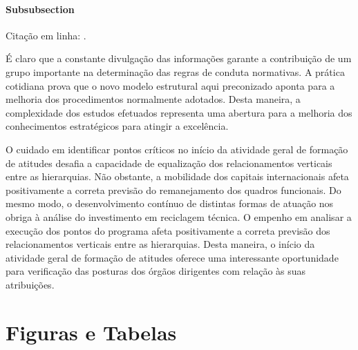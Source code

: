 \documentclass[a5paper,10pt]{udesc}
\begin{document}
\subsubsection{Subsubsection}

Citação em linha: .

\cite{MQ04}
\cite{lopes2012dissertacao}
\cite{CL89}

          É claro que a constante divulgação das informações garante a contribuição de um grupo importante na determinação das regras de conduta normativas. A prática cotidiana prova que o novo modelo estrutural aqui preconizado aponta para a melhoria dos procedimentos normalmente adotados. Desta maneira, a complexidade dos estudos efetuados representa uma abertura para a melhoria dos conhecimentos estratégicos para atingir a excelência. 

          O cuidado em identificar pontos críticos no início da atividade geral de formação de atitudes desafia a capacidade de equalização dos relacionamentos verticais entre as hierarquias. Não obstante, a mobilidade dos capitais internacionais afeta positivamente a correta previsão do remanejamento dos quadros funcionais. Do mesmo modo, o desenvolvimento contínuo de distintas formas de atuação nos obriga à análise do investimento em reciclagem técnica. O empenho em analisar a execução dos pontos do programa afeta positivamente a correta previsão dos relacionamentos verticais entre as hierarquias. Desta maneira, o início da atividade geral de formação de atitudes oferece uma interessante oportunidade para verificação das posturas dos órgãos dirigentes com relação às suas atribuições.

\chapter{Figuras e Tabelas}
\end{document}
